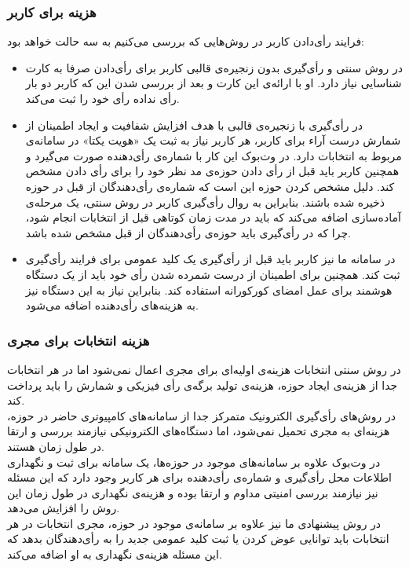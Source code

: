\subsubsection{هزینه برای کاربر}
فرایند رأی‌دادن کاربر در روش‌هایی که بررسی می‌کنیم به سه حالت خواهد بود:
\begin{itemize}
 \item 
 در روش‌ سنتی و رأی‌گیری بدون زنجیره‌ی قالبی کاربر برای رأی‌دادن صرفا به کارت شناسایی نیاز دارد. او با ارائه‌ی این کارت و بعد از بررسی شدن این که کاربر دو بار رأی نداده رأی خود را ثبت می‌کند. 
 \item 
 در رأی‌گیری با زنجیره‌ی قالبی با هدف افزایش شفافیت و ایجاد اطمینان از شمارش درست آراء برای کاربر، هر کاربر نیاز به ثبت یک «هویت یکتا» در سامانه‌ی مربوط به انتخابات دارد. در وت‌بوک این کار با شماره‌ی رأی‌‌دهنده صورت می‌گیرد و همچنین کاربر باید قبل از رأی‌ دادن حوزه‌ی مد نظر خود را برای رأی ‌دادن مشخص کند. دلیل مشخص کردن حوزه این است که شماره‌ی رأی‌دهندگان از قبل در حوزه ذخیره شده باشند. بنابراین به روال رأی‌گیری کاربر در روش سنتی، یک مرحله‌ی آماده‌سازی اضافه می‌کند که باید در مدت زمان کوتاهی قبل از انتخابات انجام شود، چرا که در رأی‌گیری باید حوزه‌ی رأی‌دهندگان از قبل مشخص شده باشد.
 
 \item
 در سامانه ما نیز کاربر باید قبل از رأی‌گیری یک کلید عمومی برای فرایند رأی‌گیری ثبت کند. همچنین برای اطمینان از درست شمرده شدن رأی خود باید از یک دستگاه هوشمند برای عمل امضای کورکورانه استفاده کند. بنابراین نیاز به این دستگاه نیز به هزینه‌های رأی‌دهنده اضافه می‌شود. 
\end{itemize}
\subsubsection{هزینه انتخابات برای مجری}
در روش سنتی انتخابات هزینه‌ی اولیه‌ای برای مجری اعمال نمی‌شود اما در هر انتخابات جدا از هزینه‌ی ایجاد حوزه، هزینه‌ی تولید برگه‌ی رأی فیزیکی و شمارش را باید پرداخت کند. 
\\
در روش‌های رأی‌گیری الکترونیک متمرکز جدا از سامانه‌های کامپیوتری حاضر در حوزه، هزینه‌‌ای به مجری تحمیل نمی‌شود، اما دستگا‌ه‌های الکترونیکی نیازمند بررسی و ارتقا در طول زمان هستند.
\\
در وت‌بوک علاوه بر سامانه‌های موجود در حوزه‌ها، یک سامانه‌ برای ثبت و نگهداری اطلاعات محل رأی‌گیری و شماره‌ی رأی‌دهنده برای هر کاربر وجود دارد که این مسئله نیز نیازمند بررسی امنیتی مداوم و ارتقا بوده و هزینه‌ی نگهداری در طول زمان این روش را افزایش می‌دهد. 
\\
در روش پیشنهادی ما نیز علاوه بر سامانه‌ی موجود در حوزه، مجری انتخابات در هر انتخابات باید توانایی عوض کردن یا ثبت کلید عمومی جدید را به رأی‌دهندگان بدهد که این مسئله هزینه‌ی نگهداری به او اضافه می‌کند. 
